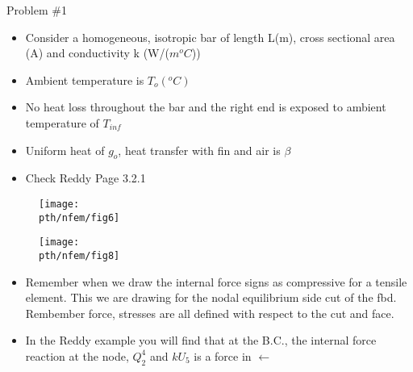 	\begin{frame}{Problem \#1}
		\begin{itemize}
			\item Consider a homogeneous, isotropic bar of length L(m), cross sectional area (A) and conductivity k (W/($m^oC$))
			\item  Ambient temperature is $T_o(^oC)$
			\item No heat loss throughout the bar and the right end is exposed to ambient temperature of $T_{inf }$
			\item Uniform heat of $g_o$, heat transfer with fin and air is $\beta$
			\item Check Reddy Page 3.2.1
		\end{itemize}
		\begin{figure}
			\centering
			\texttt{[image: \\pth/nfem/fig6]} 
		\end{figure} 
	\end{frame}


	\begin{frame}
		\begin{figure}
			\centering
			\texttt{[image: \\pth/nfem/fig8]} 
		\end{figure} 
		\begin{itemize}
			\item Remember when we draw the internal force signs as compressive for a tensile element. This we are drawing for the nodal equilibrium side cut of the fbd. Rembember force, stresses are all defined with respect to the cut and face. 
			\item In the Reddy example you will find that at the B.C., the internal force reaction at the node, $Q^4_2$ and $kU_5$ is a force in $\leftarrow$
		\end{itemize}
	\end{frame}



